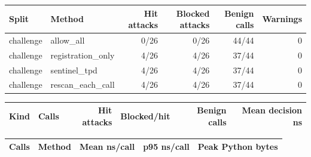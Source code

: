 \begin{tabular}{llrrrr}
Split & Method & Hit attacks & Blocked attacks & Benign calls & Warnings \\
\hline
challenge & allow\_all & 0/26 & 0/26 & 44/44 & 0 \\
challenge & registration\_only & 4/26 & 4/26 & 37/44 & 0 \\
challenge & sentinel\_tpd & 4/26 & 4/26 & 37/44 & 0 \\
challenge & rescan\_each\_call & 4/26 & 4/26 & 37/44 & 0 \\
\end{tabular}

\begin{tabular}{lrrrrr}
Kind & Calls & Hit attacks & Blocked/hit & Benign calls & Mean decision ns \\
\hline
\end{tabular}

\begin{tabular}{llrrr}
Calls & Method & Mean ns/call & p95 ns/call & Peak Python bytes \\
\hline
\end{tabular}
